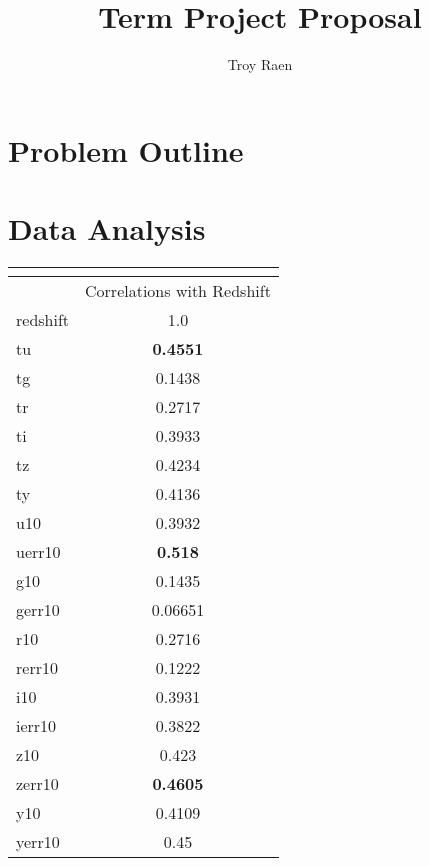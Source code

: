 \documentclass[13pt]{amsart}
\title{Term Project Proposal}
\author{Troy Raen}
\begin{document}
\maketitle



\section{Problem Outline}


\section{Data Analysis}


\begin{center}
\begin{tabular}{|l|c|}
\multicolumn{2}{c}{} \\ \hline 
 & Correlations with Redshift \\ \hline
redshift & 1.0 \\ \hline
tu & \textbf{0.4551} \\ \hline
tg & 0.1438 \\ \hline
tr & 0.2717 \\ \hline
ti & 0.3933 \\ \hline
tz & 0.4234 \\ \hline
ty & 0.4136 \\ \hline
u10 & 0.3932 \\ \hline
uerr10 & \textbf{0.518} \\ \hline
g10 & 0.1435 \\ \hline
gerr10 & 0.06651 \\ \hline
r10 & 0.2716 \\ \hline
rerr10 & 0.1222 \\ \hline
i10 & 0.3931 \\ \hline
ierr10 & 0.3822 \\ \hline
z10 & 0.423 \\ \hline
zerr10 & \textbf{0.4605} \\ \hline
y10 & 0.4109 \\ \hline
yerr10 & 0.45 \\ \hline
\end{tabular}
\end{center}
\end{document}
